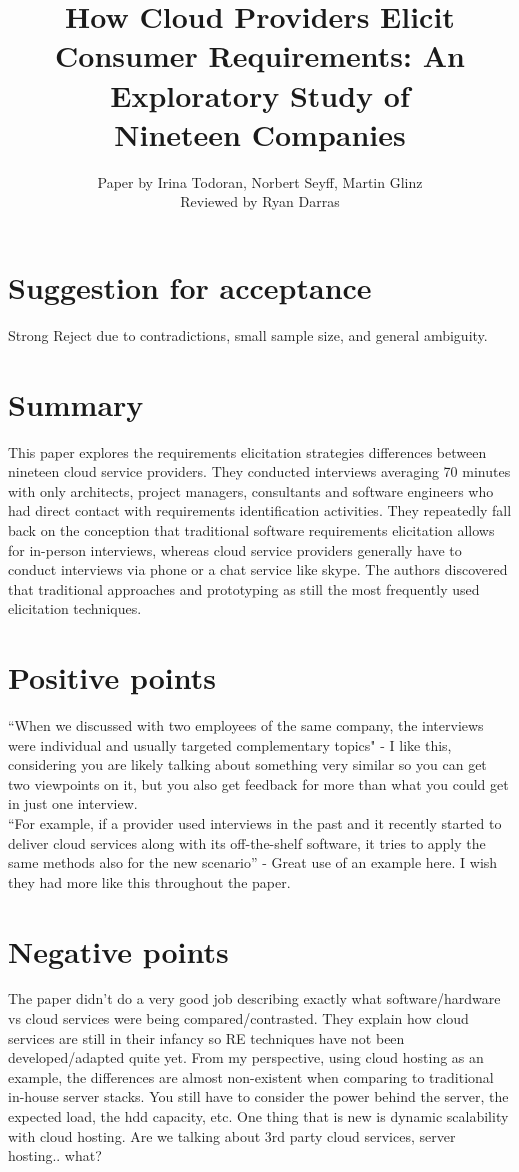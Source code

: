 \documentclass[10pt,twoside]{IEEEtran}
\title{How Cloud Providers Elicit Consumer Requirements: An Exploratory Study of\\ Nineteen Companies}
\author{Paper by Irina Todoran, Norbert Seyff, Martin Glinz\\Reviewed by Ryan Darras}
\begin{document}
\maketitle

\section{Suggestion for acceptance}
Strong Reject due to contradictions, small sample size, and general ambiguity.

\section{Summary}
This paper explores the requirements elicitation strategies differences between nineteen cloud service providers. They conducted interviews averaging 70 minutes with only architects, project managers, consultants and software engineers who had direct contact with requirements identification activities. They repeatedly fall back on the conception that traditional software requirements elicitation allows for in-person interviews, whereas cloud service providers generally have to conduct interviews via phone or a chat service like skype. The authors discovered that traditional approaches and prototyping as still the most frequently used elicitation techniques.

\section{Positive points}
``When we discussed with two employees of the same company, the interviews were individual and usually targeted complementary topics" - I like this, considering you are likely talking about something very similar so you can get two viewpoints on it, but you also get feedback for more than what you could get in just one interview. \\

``For example, if a provider used interviews in the past and it recently started to deliver cloud services along with its off-the-shelf software, it tries to apply the same methods also for the new scenario'' - Great use of an example here. I wish they had more like this throughout the paper.


\section{Negative points}
The paper didn't do a very good job describing exactly what software/hardware vs cloud services were being compared/contrasted. They explain how cloud services are still in their infancy so RE techniques have not been developed/adapted quite yet. From my perspective, using cloud hosting as an example, the differences are almost non-existent when comparing to traditional in-house server stacks. You still have to consider the power behind the server, the expected load, the hdd capacity, etc. One thing that is new is dynamic scalability with cloud hosting. Are we talking about 3rd party cloud services, server hosting.. what?\\
\end{document}
